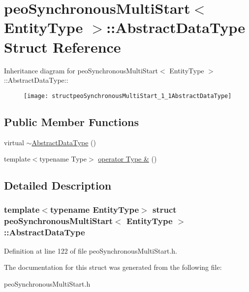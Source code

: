 \hypertarget{structpeoSynchronousMultiStart_1_1AbstractDataType}{
\section{peo\-Synchronous\-Multi\-Start$<$ Entity\-Type $>$::Abstract\-Data\-Type Struct Reference}
\label{structpeoSynchronousMultiStart_1_1AbstractDataType}
}
Inheritance diagram for peo\-Synchronous\-Multi\-Start$<$ Entity\-Type $>$::Abstract\-Data\-Type::\begin{figure}[H]
\begin{center}
\leavevmode
\texttt{[image: structpeoSynchronousMultiStart\_1\_1AbstractDataType]}
\end{center}
\end{figure}
\subsection*{Public Member Functions}
\begin{CompactItemize}
\item 
\hypertarget{structpeoSynchronousMultiStart_1_1AbstractDataType_4d868a93f8e97621ec5c7b6a2e28b265}{
virtual \hyperlink{structpeoSynchronousMultiStart_1_1AbstractDataType_4d868a93f8e97621ec5c7b6a2e28b265}{$\sim$Abstract\-Data\-Type} ()}
\label{structpeoSynchronousMultiStart_1_1AbstractDataType_4d868a93f8e97621ec5c7b6a2e28b265}

\item 
\hypertarget{structpeoSynchronousMultiStart_1_1AbstractDataType_a4addfca8a9acecadb4c786deed36934}{
template$<$typename Type$>$ \hyperlink{structpeoSynchronousMultiStart_1_1AbstractDataType_a4addfca8a9acecadb4c786deed36934}{operator Type \&} ()}
\label{structpeoSynchronousMultiStart_1_1AbstractDataType_a4addfca8a9acecadb4c786deed36934}

\end{CompactItemize}


\subsection{Detailed Description}
\subsubsection*{template$<$typename Entity\-Type$>$ struct peo\-Synchronous\-Multi\-Start$<$ Entity\-Type $>$::Abstract\-Data\-Type}





Definition at line 122 of file peo\-Synchronous\-Multi\-Start.h.

The documentation for this struct was generated from the following file:\begin{CompactItemize}
\item 
peo\-Synchronous\-Multi\-Start.h\end{CompactItemize}
